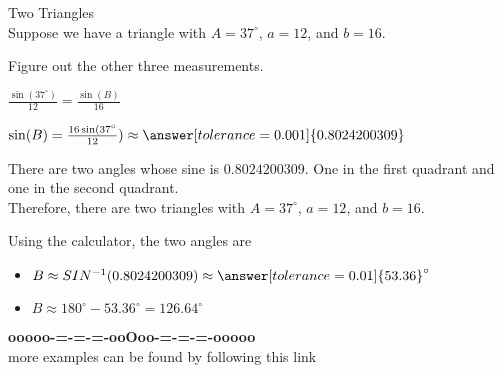 \documentclass{ximera}
\begin{document}
\begin{example}  Two Triangles \\

Suppose we have a triangle with $A=37^{\circ}$, $a=12$, and $b=16$.

Figure out the other three measurements.


\begin{explanation}


$\frac{\sin(37^{\circ})}{12} = \frac{\sin(B)}{16}$

$\sin(B) = \frac{16 \sin(37^{\circ}}{12}) \approx \answer[tolerance=0.001]{0.8024200309}$

There are two angles whose sine is $0.8024200309$. One in the first quadrant and one in the second quadrant. \\

Therefore, there are two triangles with $A=37^{\circ}$, $a=12$, and $b=16$. 

Using the calculator, the two angles are

\begin{itemize}
\item $B \approx SIN^{-1}(0.8024200309) \approx \answer[tolerance=0.01]{53.36}^{\circ}$
\item $B \approx 180^{\circ} - 53.36^{\circ} = 126.64^{\circ}$
\end{itemize}

\end{explanation}


\end{example}














\begin{center}
\textbf{\textcolor{green!50!black}{ooooo-=-=-=-ooOoo-=-=-=-ooooo}} \\

more examples can be found by following this link\\ 

\end{center}
\end{document}
